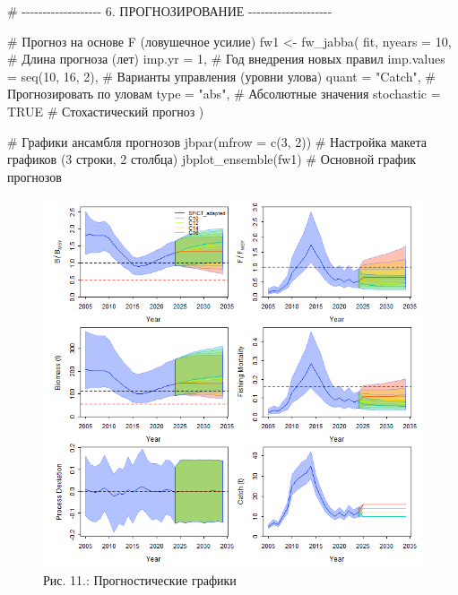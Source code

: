 \documentclass[
  letterpaper,
  DIV=11,
  numbers=noendperiod]{scrreprt}
\newenvironment{Shaded}{\begin{snugshade}}{\end{snugshade}}
\newcommand{\AttributeTok}[1]{\textcolor[rgb]{0.40,0.45,0.13}{#1}}
\newcommand{\CommentTok}[1]{\textcolor[rgb]{0.37,0.37,0.37}{#1}}
\newcommand{\ConstantTok}[1]{\textcolor[rgb]{0.56,0.35,0.01}{#1}}
\newcommand{\DecValTok}[1]{\textcolor[rgb]{0.68,0.00,0.00}{#1}}
\newcommand{\FunctionTok}[1]{\textcolor[rgb]{0.28,0.35,0.67}{#1}}
\newcommand{\NormalTok}[1]{\textcolor[rgb]{0.00,0.23,0.31}{#1}}
\newcommand{\OtherTok}[1]{\textcolor[rgb]{0.00,0.23,0.31}{#1}}
\newcommand{\StringTok}[1]{\textcolor[rgb]{0.13,0.47,0.30}{#1}}
\begin{document}
\begin{Shaded}
\begin{Highlighting}[]
\CommentTok{\# {-}{-}{-}{-}{-}{-}{-}{-}{-}{-}{-}{-}{-}{-}{-}{-}{-}{-}{-} 6. ПРОГНОЗИРОВАНИЕ {-}{-}{-}{-}{-}{-}{-}{-}{-}{-}{-}{-}{-}{-}{-}{-}{-}{-}{-}{-}}

\CommentTok{\# Прогноз на основе F (ловушечное усилие)}
\NormalTok{fw1 }\OtherTok{\textless{}{-}} \FunctionTok{fw\_jabba}\NormalTok{(}
\NormalTok{  fit,}
  \AttributeTok{nyears =} \DecValTok{10}\NormalTok{,       }\CommentTok{\# Длина прогноза (лет)}
  \AttributeTok{imp.yr =} \DecValTok{1}\NormalTok{,        }\CommentTok{\# Год внедрения новых правил}
  \AttributeTok{imp.values =} \FunctionTok{seq}\NormalTok{(}\DecValTok{10}\NormalTok{, }\DecValTok{16}\NormalTok{, }\DecValTok{2}\NormalTok{), }\CommentTok{\# Варианты управления (уровни улова)}
  \AttributeTok{quant =} \StringTok{"Catch"}\NormalTok{,   }\CommentTok{\# Прогнозировать по уловам}
  \AttributeTok{type =} \StringTok{"abs"}\NormalTok{,      }\CommentTok{\# Абсолютные значения}
  \AttributeTok{stochastic =} \ConstantTok{TRUE}  \CommentTok{\# Стохастический прогноз}
\NormalTok{)}

\CommentTok{\# Графики ансамбля прогнозов}
\FunctionTok{jbpar}\NormalTok{(}\AttributeTok{mfrow =} \FunctionTok{c}\NormalTok{(}\DecValTok{3}\NormalTok{, }\DecValTok{2}\NormalTok{)) }\CommentTok{\# Настройка макета графиков (3 строки, 2 столбца)}
\FunctionTok{jbplot\_ensemble}\NormalTok{(fw1)    }\CommentTok{\# Основной график прогнозов}
\end{Highlighting}
\end{Shaded}

\begin{figure}[H]

{\centering \includegraphics[width=0.8\linewidth,height=\textheight,keepaspectratio]{images/JABBA11.PNG}

}

\caption{Рис. 11.: Прогностические графики}

\end{figure}%
\end{document}
